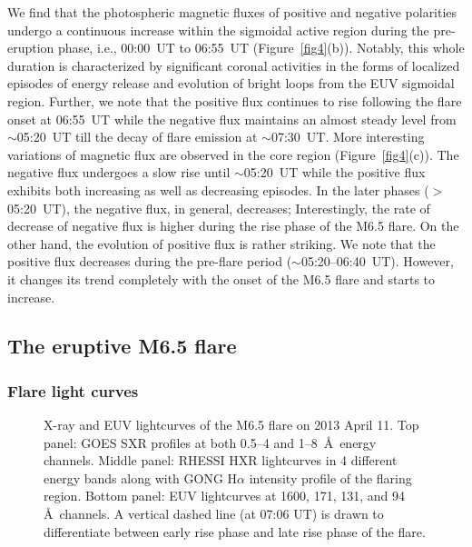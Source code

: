 \documentclass[twocolumn]{aastex6}
\begin{document}
We find that the photospheric magnetic fluxes of positive and negative polarities undergo a continuous increase within the sigmoidal active region 
during the pre-eruption phase, i.e., 00:00~UT to 06:55~UT 
(Figure~\ref{fig4}(b)). Notably, this whole duration is characterized by significant coronal activities in the forms of localized episodes of energy release and evolution of bright loops from the EUV sigmoidal region. Further, we note that the positive flux continues to rise following the flare onset at 06:55~UT while the negative flux maintains an almost steady level from $\sim$05:20~UT till the decay of flare emission at $\sim$07:30~UT. More interesting variations of magnetic flux are observed in the core region (Figure~\ref{fig4}(c)). The negative flux undergoes a slow rise until $\sim$05:20~UT while the positive flux exhibits both increasing as well as decreasing episodes. In the later phases ($>$05:20~UT), the negative flux, in general, decreases; Interestingly, the rate of decrease of negative flux is higher during the rise phase of the M6.5 flare. On the other hand, the evolution of positive flux is rather striking. We note that the positive flux decreases during the pre-flare period ($\sim$05:20--06:40~UT). However, it changes its trend completely with the onset of the M6.5 flare and starts to increase.     

\subsection{The eruptive M6.5 flare}
\label{sec_M6.5}
\subsubsection{Flare light curves}
\label{sec_lc}

\begin{figure}
\caption{X-ray and EUV lightcurves of the M6.5 flare on 2013 April 11. Top panel: GOES SXR profiles at both 0.5--4 and 1--8~\AA~energy channels. Middle panel: RHESSI HXR lightcurves in 4 different energy bands along with GONG H$ \alpha $ intensity profile of the flaring region. Bottom panel: EUV lightcurves at 1600, 171, 131, and 94 \AA~channels. A vertical dashed line (at 07:06 UT) is drawn to differentiate between early rise phase and late rise phase of the flare.}
\label{fig5}
\end{figure}
\end{document}

